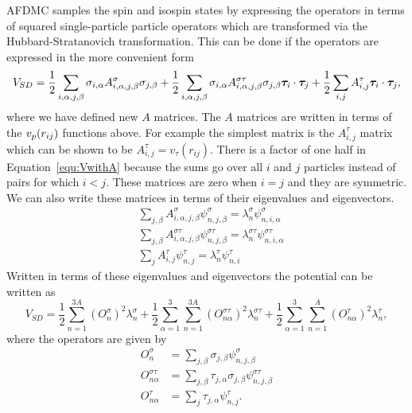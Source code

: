 AFDMC samples the spin and isospin states by expressing the operators in terms of squared single-particle particle operators which are transformed via the Hubbard-Stratanovich transformation. This can be done if the operators are expressed in the more convenient form
\begin{equation}
   V_{SD} = \frac{1}{2}\sum\limits_{i,\alpha,j,\beta} \sigma_{i,\alpha}A^{\sigma}_{i,\alpha,j,\beta}\sigma_{j,\beta}
      + \frac{1}{2}\sum\limits_{i,\alpha,j,\beta} \sigma_{i,\alpha}A^{\sigma\tau}_{i,\alpha,j,\beta}\sigma_{j,\beta}\bm{\tau}_i\cdot\bm{\tau}_j
      + \frac{1}{2}\sum\limits_{i,j} A^{\tau}_{i,j}\bm{\tau}_i\cdot\bm{\tau}_j,
   \label{equ:VwithA}
\end{equation}
where we have defined new $A$ matrices. The $A$ matrices are written in terms of the $v_p(r_{ij})$ functions above. For example the simplest matrix is the $A^{\tau}_{i,j}$ matrix which can be shown to be $A^{\tau}_{i,j} = v_{\tau}(r_{ij})$. There is a factor of one half in Equation~\ref{equ:VwithA} because the sums go over all $i$ and $j$ particles instead of pairs for which $i<j$. These matrices are zero when $i=j$ and they are symmetric. We can also write these matrices in terms of their eigenvalues and eigenvectors.
\begin{align}
   &\sum\limits_{j,\beta} A^{\sigma}_{i,\alpha,j,\beta}\psi^{\sigma}_{n,j,\beta} = \lambda^{\sigma}_n\psi^{\sigma}_{n,i,\alpha} \\
   &\sum\limits_{j,\beta} A^{\sigma\tau}_{i,\alpha,j,\beta}\psi^{\sigma\tau}_{n,j,\beta} = \lambda^{\sigma\tau}_n\psi^{\sigma\tau}_{n,i,\alpha} \\
   &\sum\limits_{j} A^{\tau}_{i,j}\psi^{\tau}_{n,j} = \lambda^{\tau}_n\psi^{\tau}_{n,i}
\end{align}
Written in terms of these eigenvalues and eigenvectors the potential can be written as
\begin{equation}
   V_{SD} = \frac{1}{2}\sum\limits_{n=1}^{3A} \left(O_{n}^{\sigma}\right)^2 \lambda_n^{\sigma}
      + \frac{1}{2}\sum\limits_{\alpha=1}^{3}\sum\limits_{n=1}^{3A} \left(O_{n\alpha}^{\sigma\tau}\right)^2 \lambda_n^{\sigma\tau}
      + \frac{1}{2}\sum\limits_{\alpha=1}^{3}\sum\limits_{n=1}^{A} \left(O_{n\alpha}^{\tau}\right)^2 \lambda_n^{\tau},
\end{equation}
where the operators are given by
\begin{equation}
\begin{split}
   O_{n}^{\sigma} &= \sum\limits_{j,\beta} \sigma_{j,\beta}\psi_{n,j,\beta}^{\sigma} \\
   O_{n\alpha}^{\sigma\tau} &= \sum\limits_{j,\beta} \tau_{j,\alpha}\sigma_{j,\beta}\psi_{n,j,\beta}^{\sigma\tau} \\
   O_{n\alpha}^{\tau} &= \sum\limits_{j} \tau_{j,\alpha}\psi_{n,j}^{\tau}.
\end{split}
\end{equation}
